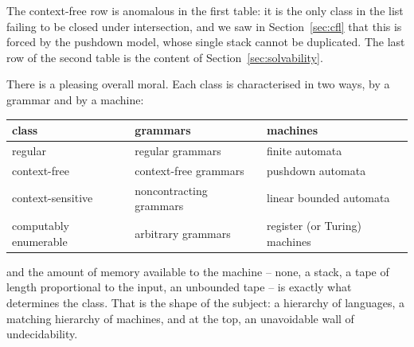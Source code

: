 The context-free row is anomalous in the first table: it is the only class in the list failing to be closed under intersection, and we saw in Section~\ref{sec:cfl} that this is forced by the pushdown model, whose single stack cannot be duplicated. The last row of the second table is the content of Section~\ref{sec:solvability}.

There is a pleasing overall moral. Each class is characterised in two ways, by a grammar and by a machine:
\begin{center}
	\begin{tabular}{l|l|l}
		class & grammars & machines \\\hline
		regular & regular grammars & finite automata \\
		context-free & context-free grammars & pushdown automata \\
		context-sensitive & noncontracting grammars & linear bounded automata \\
		computably enumerable & arbitrary grammars & register (or Turing) machines
	\end{tabular}
\end{center}
and the amount of memory available to the machine -- none, a stack, a tape of length proportional to the input, an unbounded tape -- is exactly what determines the class. That is the shape of the subject: a hierarchy of languages, a matching hierarchy of machines, and at the top, an unavoidable wall of undecidability.

